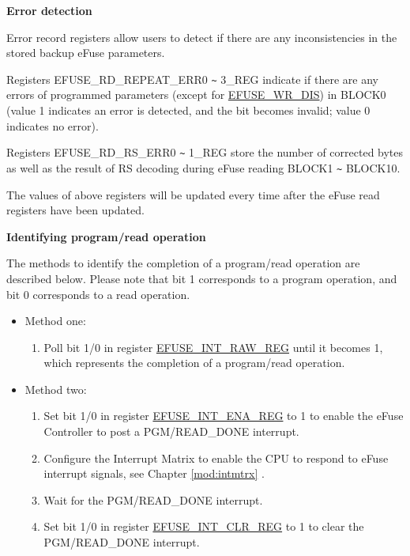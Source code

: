 \documentclass[main\_\_EN.tex]{subfiles}
\begin{document}
{\bfseries Error detection}

Error record registers allow users to detect if there are any inconsistencies in the stored backup eFuse parameters.

Registers EFUSE\_RD\_REPEAT\_ERR0 \verb+~+ 3\_REG indicate if there are any errors of programmed parameters (except for \hyperref[fielddesc:EFUSEWRDIS]{EFUSE\_WR\_DIS}) in BLOCK0 (value 1 indicates an error is detected, and the bit becomes invalid; value 0 indicates no error).

Registers EFUSE\_RD\_RS\_ERR0 \verb+~+ 1\_REG store the number of corrected bytes as well as the result of RS decoding during eFuse reading BLOCK1 \verb+~+ BLOCK10.

The values of above registers will be updated every time after the eFuse read registers have been updated.

{\bfseries Identifying program/read operation}

    The methods to identify the completion of a program/read operation are described below. Please note that bit 1 corresponds to a program operation, and bit 0 corresponds to a read operation.
    \begin{itemize}
    \item Method one:
        \begin{enumerate}
            \item Poll bit 1/0 in register \hyperref[regdesc:EFUSEINTRAWREG]{EFUSE\_INT\_RAW\_REG} until it becomes 1, which represents the completion of a program/read operation.
        \end{enumerate}
    \item Method two:
        \begin{enumerate}
            \item Set bit 1/0 in register \hyperref[regdesc:EFUSEINTENAREG]{EFUSE\_INT\_ENA\_REG} to 1 to enable the eFuse Controller to post a PGM/READ\_DONE interrupt.
            \item Configure the Interrupt Matrix to enable the CPU to respond to eFuse interrupt signals, see Chapter \ref{mod:intmtrx} \textit{}.
            \item Wait for the PGM/READ\_DONE interrupt.
            \item Set bit 1/0 in register \hyperref[regdesc:EFUSEINTCLRREG]{EFUSE\_INT\_CLR\_REG} to 1 to clear the PGM/READ\_DONE interrupt.
    \end{enumerate}
\end{itemize}
\end{document}
